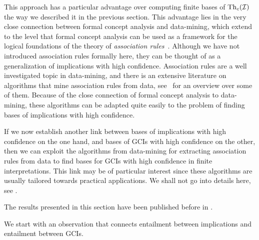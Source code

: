 This approach has a particular advantage over computing finite bases of
$\operatorname{Th}_c(\mathcal{I})$ the way we described it in the previous section.  This advantage lies
in the very close connection between formal concept analysis and data-mining, which extend
to the level that formal concept analysis can be used as a framework for the logical
foundations of the theory of \emph{association rules}~\cite{arules:Zaki:1998}.  Although
we have not introduced association rules formally here, they can be thought of as a
generalization of implications with high confidence.  Association rules are a well
investigated topic in data-mining, and there is an extensive literature on algorithms that
mine association rules from data, see~\cite{arules:Hipp:2000} for an overview over some of
them.  Because of the close connection of formal concept analysis to data-mining, these
algorithms can be adapted quite easily to the problem of finding bases of implications
with high confidence.

If we now establish another link between bases of implications with high confidence on the
one hand, and bases of GCIs with high confidence on the other, then we can exploit the
algorithms from data-mining for extracting association rules from data to find bases for
GCIs with high confidence in finite interpretations.  This link may be of particular
interest since these algorithms are usually tailored towards practical applications.  We
shall not go into details here, see .

The results presented in this section have been published before in
\cite{Borchmann-LTCS-12-06}.

We start with an observation that connects entailment between implications and entailment
between GCIs.

